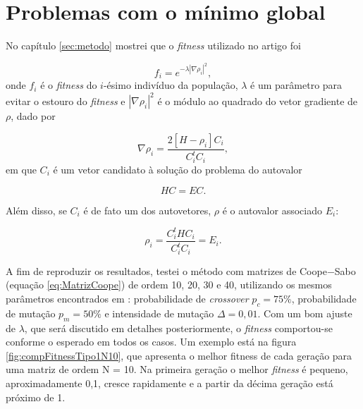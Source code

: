 \section{Problemas com o mínimo global}	
	
	No capítulo \ref{sec:metodo} mostrei que o \textit{fitness} utilizado no artigo \cite{metodo2004}  foi
	
	\begin{equation}
		\label{eq:fitnessGrad2}
		f_i = e^{-\lambda |\nabla \rho_i|^2},
	\end{equation}
	onde $f_i$ é o \textit{fitness} do $i$-ésimo indivíduo da população, $\lambda$ é um parâmetro para evitar o estouro do \textit{fitness} e $| \nabla \rho_i|^2$ é o módulo ao quadrado do vetor gradiente de $\rho$, dado por
		
				\begin{equation}
					\nabla \rho_i = \frac{2[H - \rho_i]C_i}{C_i^t C_i},
				\end{equation}
	em que $C_i$ é um vetor candidato à solução do problema do autovalor
	
	\begin{equation}
		HC = EC.
	\end{equation}
	
	Além disso, se $C_i$ é de fato um dos autovetores, $\rho$ é o autovalor associado $E_i$:
	
	\begin{equation}\label{eq:rho_eh_E}
		\rho_i = \frac{C_i^t H C_i}{C_i^t C_i} = E_i.
	\end{equation}
	
	A fim de reproduzir os resultados, testei o método com matrizes de Coope$-$Sabo (equação \ref{eq:MatrizCoope}) de ordem 10, 20, 30 e 40, utilizando os mesmos parâmetros encontrados em \cite{metodo2004}: probabilidade de \textit{crossover} $p_c = 75\%$, probabilidade de mutação $p_m = 50\%$ e intensidade de mutação $\Delta = 0,01$. Com um bom ajuste de $\lambda$, que será discutido em detalhes posteriormente, o \textit{fitness} comportou-se conforme o esperado em todos os casos. Um exemplo está na figura \ref{fig:compFitnessTipo1N10}, que apresenta o melhor fitness de cada geração para uma matriz de ordem N = 10. Na primeira geração o melhor \textit{fitness} é pequeno, aproximadamente 0,1, cresce rapidamente e a partir da décima geração está próximo de 1.
	
